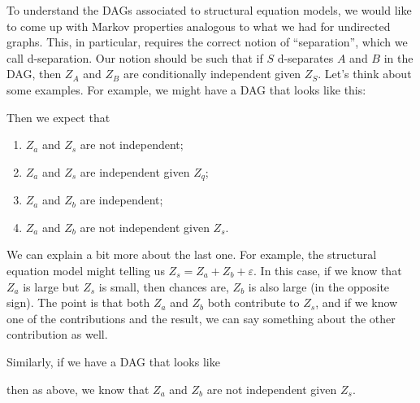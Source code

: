 \documentclass[a4paper]{article}
\begin{document}
To understand the DAGs associated to structural equation models, we would like to come up with Markov properties analogous to what we had for undirected graphs. This, in particular, requires the correct notion of ``separation'', which we call d-separation. Our notion should be such that if $S$ d-separates $A$ and $B$ in the DAG, then $Z_A$ and $Z_B$ are conditionally independent given $Z_S$. Let's think about some examples. For example, we might have a DAG that looks like this:
\begin{center}
\end{center}
Then we expect that
\begin{enumerate}
  \item $Z_a$ and $Z_s$ are not independent;
  \item $Z_a$ and $Z_s$ are independent given $Z_q$;
  \item $Z_a$ and $Z_b$ are independent;
  \item $Z_a$ and $Z_b$ are not independent given $Z_s$.
\end{enumerate}
We can explain a bit more about the last one. For example, the structural equation model might telling us $Z_s = Z_a + Z_b + \varepsilon$. In this case, if we know that $Z_a$ is large but $Z_s$ is small, then chances are, $Z_b$ is also large (in the opposite sign). The point is that both $Z_a$ and $Z_b$ both contribute to $Z_s$, and if we know one of the contributions and the result, we can say something about the other contribution as well.

Similarly, if we have a DAG that looks like
\begin{center}
\end{center}
then as above, we know that $Z_a$ and $Z_b$ are not independent given $Z_s$.
\end{document}
